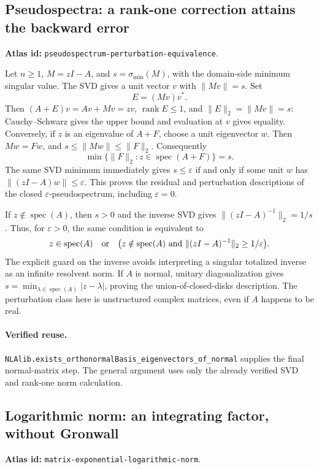 \documentclass[11pt,a4paper]{article}
\DeclareMathOperator{\rank}{rank}
\DeclareRobustCommand{\code}[1]{{\footnotesize\urlstyle{tt}\nolinkurl{#1}}}
\begin{document}
\subsection{Pseudospectra: a rank-one correction attains the backward error}
\label{sec:eq-pseudospectrum}
\textbf{Atlas id:} \code{pseudospectrum-perturbation-equivalence}.

Let $n\ge1$, $M=zI-A$, and $s=\sigma_{\min}(M)$, with the
domain-side minimum singular value. The SVD gives a unit vector $v$
with $\|Mv\|=s$. Set
\[
 E=(Mv)v^*.
\]
Then $(A+E)v=Av+Mv=zv$, $\rank E\le1$, and
$\|E\|_2=\|Mv\|=s$: Cauchy--Schwarz gives the upper bound and
evaluation at $v$ gives equality. Conversely, if $z$ is an eigenvalue
of $A+F$, choose a unit eigenvector $w$. Then
$Mw=Fw$, and
$s\le\|Mw\|\le\|F\|_2$. Consequently
\[
 \min\{\|F\|_2:z\in\operatorname{spec}(A+F)\}=s.
\]
The same SVD minimum immediately gives
$s\le\varepsilon$ if and only if some unit $w$ has
$\|(zI-A)w\|\le\varepsilon$. This proves the residual and perturbation
descriptions of the closed $\varepsilon$-pseudospectrum, including
$\varepsilon=0$.

If $z\notin\operatorname{spec}(A)$, then $s>0$ and the inverse SVD
gives $\|(zI-A)^{-1}\|_2=1/s$. Thus, for $\varepsilon>0$, the same
condition is equivalent to
\[
 z\in\operatorname{spec}(A)
 \quad\hbox{or}\quad
 \bigl(z\notin\operatorname{spec}(A)\ \hbox{and}\
       \|(zI-A)^{-1}\|_2\ge1/\varepsilon\bigr).
\]
The explicit guard on the inverse avoids interpreting a singular
totalized inverse as an infinite resolvent norm. If $A$ is normal,
unitary diagonalization gives
$s=\min_{\lambda\in\operatorname{spec}(A)}|z-\lambda|$, proving the
union-of-closed-disks description. The perturbation class here is
unstructured complex matrices, even if $A$ happens to be real.

\paragraph{Verified reuse.}
\code{NLAlib.exists_orthonormalBasis_eigenvectors_of_normal} supplies
the final normal-matrix step. The general argument uses only the
already verified SVD and rank-one norm calculation.

\subsection{Logarithmic norm: an integrating factor, without Gronwall}
\label{sec:eq-lognorm}
\textbf{Atlas id:} \code{matrix-exponential-logarithmic-norm}.
\end{document}
